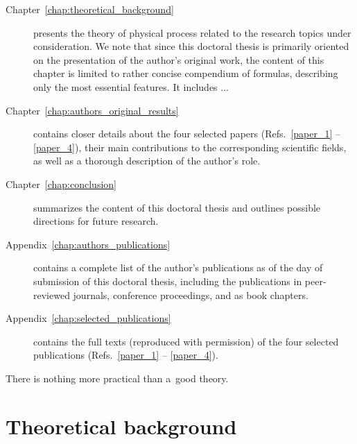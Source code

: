\documentclass[10pt, a4paper, twoside, openright]{report}
\begin{document}
\begin{description}
	\item[Chapter~\ref{chap:theoretical_background}] presents the theory of physical process related to the research topics under consideration. We note that since this doctoral thesis is primarily oriented on the presentation of the author's original work, the content of this chapter is limited to rather concise compendium of formulas, describing only the most essential features. It includes ... 
	
	\item[Chapter~\ref{chap:authors_original_results}] contains closer details about the four selected papers (Refs.~\ref{paper_1} -- \ref{paper_4}), their main contributions to the corresponding scientific fields, as well as a thorough description of the author's role. 
	
	\item[Chapter~\ref{chap:conclusion}] summarizes the content of this doctoral thesis and outlines possible directions for future research. 
	
	
	\item[Appendix~\ref{chap:authors_publications}] contains a complete list of the author's publications as of the day of submission of this doctoral thesis, including the publications in peer-reviewed journals, conference proceedings, and as book chapters.
	
	\item[Appendix~\ref{chap:selected_publications}] contains the full texts (reproduced with permission) of the four selected publications (Refs.~\ref{paper_1} -- \ref{paper_4}).
\end{description}




\begin{savequote}[0.45\linewidth]
	\begin{fquote}
		 There is nothing more practical than a~good theory.
	\end{fquote}
\end{savequote}

\chapter{Theoretical background\label{chap:theoretical_background}}
\end{document}

